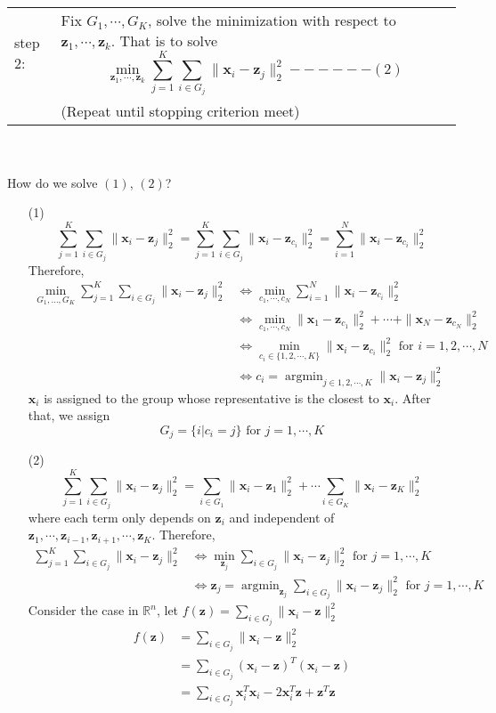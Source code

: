 \documentclass[11pt]{article}
\newcommand{\R}{\mathbb{R}}
\newcommand{\vx}{\mathbf{x}}
\newcommand{\vz}{\mathbf{z}}
\begin{document}
\begin{enumerate}
\begin{tabular}{lp{15cm}}
step 2:& Fix $G_1, \cdots, G_K$, solve the minimization with respect to $\vz_1, \cdots, \vz_k$. That is to solve $$\min_{\vz_1, \cdots, \vz_k} \sum_{j=1}^{K} \sum_{i \in G_j} \|\vx_i - \vz_j\|_2^2 ------(2)$$\\
&(Repeat until stopping criterion meet)
\end{tabular}\\\\
How do we solve $(1)$, $(2)$?
\begin{enumerate}
\item[(1)] $$\sum_{j=1}^{K} \sum_{i \in G_j} \| \vx_i -\vz_j\|_2^2 = \sum_{j=1}^{K} \sum_{i \in G_j}\| \vx_i -\vz_{c_i}\|_2^2 = \sum_{i=1}^{N} \| \vx_i - \vz_{c_i}\|_2^2$$
Therefore, \begin{align*}
\min_{G_1, \ldots, G_K} \sum_{j=1}^{K} \sum_{i \in G_j} \|\vx_i - \vz_j\|_2^2 &\iff \min_{c_1, \cdots, c_N} \sum_{i=1}^{N} \|\vx_i - \vz_{c_i}\|_2^2\\
&\iff \min_{c_1, \cdots, c_N}  \|\vx_1 - \vz_{c_1} \|_2^2 + \cdots +\|\vx_N - \vz_{c_N} \|_2^2 \\
&\iff \min_{c_i \in \{1,2, \cdots, K\}} \|\vx_i - \vz_{c_i} \|_2^2 \text{ for } i = 1, 2, \cdots, N\\
&\iff c_i = \mathop{\arg\min}_{j \in {1, 2, \cdots, K}} \|\vx_i - \vz_j \|_2^2
\end{align*}
$\vx_i$ is assigned to the group whose representative is the closest to $\vx_i$. After that, we assign $$G_j = \{i | c_i = j\} \text{ for } j = 1, \cdots, K$$
\item[(2)] $$\sum_{j=1}^{K} \sum_{i \in G_j} \| \vx_i -\vz_j\|_2^2 = \sum_{i \in G_1} \|\vx_i - \vz_1 \|_2^2 + \cdots \sum_{i \in G_K} \|\vx_i - \vz_K \|_2^2$$
where each term only depends on $\vz_i$ and independent of $\vz_1, \cdots,\vz_{i-1},\vz_{i+1},\cdots,\vz_K$. Therefore, 
\begin{align*}
\sum_{j=1}^{K} \sum_{i \in G_j} \| \vx_i -\vz_j\|_2^2 &\iff \min_{\vz_j} \sum_{i \in G_j} \|\vx_i - \vz_j\|_2^2 \text{ for }j=1, \cdots, K\\
&\iff \vz_j = \mathop{\arg \min}_{\vz_j} \sum_{i \in G_j} \|\vx_i - \vz_j\|_2^2 \text{ for }j=1, \cdots, K
\end{align*}
Consider the case in $\R^n$, let $f(\vz) = \sum_{i \in G_j} \|\vx_i - \vz\|_2^2$
\begin{align*}
f(\vz) &= \sum_{i \in G_j} \|\vx_i - \vz\|_2^2\\
&= \sum_{i \in G_j} (\vx_i - \vz)^T (\vx_i - \vz)\\
&= \sum_{i \in G_j} \vx_i^T \vx_i -2\vx_i^T\vz + \vz^T \vz\\

\end{align*}
\end{enumerate}
\end{enumerate}
\end{document}
